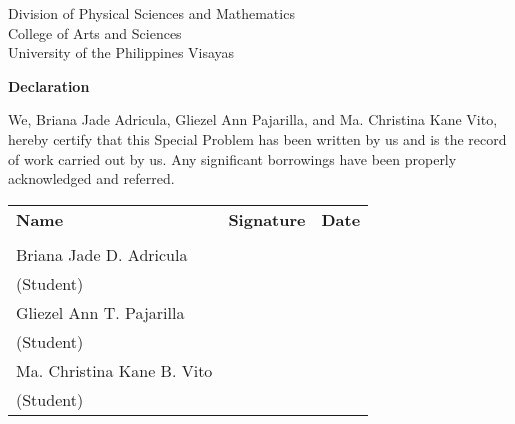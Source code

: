 \begin{center}
	Division of Physical Sciences and Mathematics\\
	College of Arts and Sciences\\
	University of the Philippines Visayas 
	
		\textbf{Declaration}
		\end{center}

We,  Briana Jade Adricula, Gliezel Ann Pajarilla, and Ma. Christina Kane Vito, hereby certify that this Special Problem has been written by us  and is the record of work carried out by us. Any significant borrowings have been properly acknowledged and referred.

	\begin{tabular}{lll}
	\bfseries Name  & \bfseries Signature & \bfseries Date\\ \\
	Briana Jade D. Adricula &\signaturerule  & \signaturerule\\ 
	\multicolumn{1}{l}{(Student)} \\ 
	Gliezel Ann T. Pajarilla &\signaturerule  & \signaturerule\\ 
	\multicolumn{1}{l}{(Student)} \\
	Ma. Christina Kane B. Vito &\signaturerule  & \signaturerule\\ 
\multicolumn{1}{l}{(Student)} \\

\end{tabular}



